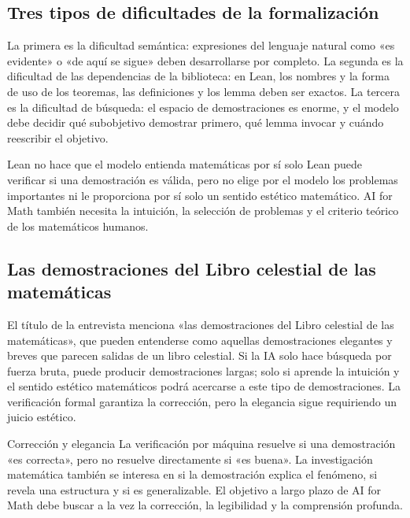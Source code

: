 \documentclass[a4paper]{article}
\begin{document}
\subsection{Tres tipos de dificultades de la formalización}

La primera es la dificultad semántica: expresiones del lenguaje natural como «es evidente» o «de aquí se sigue» deben desarrollarse por completo. La segunda es la dificultad de las dependencias de la biblioteca: en Lean, los nombres y la forma de uso de los teoremas, las definiciones y los lemma deben ser exactos. La tercera es la dificultad de búsqueda: el espacio de demostraciones es enorme, y el modelo debe decidir qué subobjetivo demostrar primero, qué lemma invocar y cuándo reescribir el objetivo.

\begin{warningbox}{Lean no hace que el modelo entienda matemáticas por sí solo}
Lean puede verificar si una demostración es válida, pero no elige por el modelo los problemas importantes ni le proporciona por sí solo un sentido estético matemático. AI for Math también necesita la intuición, la selección de problemas y el criterio teórico de los matemáticos humanos.
\end{warningbox}

\subsection{Las demostraciones del Libro celestial de las matemáticas}

El título de la entrevista menciona «las demostraciones del Libro celestial de las matemáticas», que pueden entenderse como aquellas demostraciones elegantes y breves que parecen salidas de un libro celestial. Si la IA solo hace búsqueda por fuerza bruta, puede producir demostraciones largas; solo si aprende la intuición y el sentido estético matemáticos podrá acercarse a este tipo de demostraciones. La verificación formal garantiza la corrección, pero la elegancia sigue requiriendo un juicio estético.

\begin{importantbox}{Corrección y elegancia}
La verificación por máquina resuelve si una demostración «es correcta», pero no resuelve directamente si «es buena». La investigación matemática también se interesa en si la demostración explica el fenómeno, si revela una estructura y si es generalizable. El objetivo a largo plazo de AI for Math debe buscar a la vez la corrección, la legibilidad y la comprensión profunda.
\end{importantbox}
\end{document}
